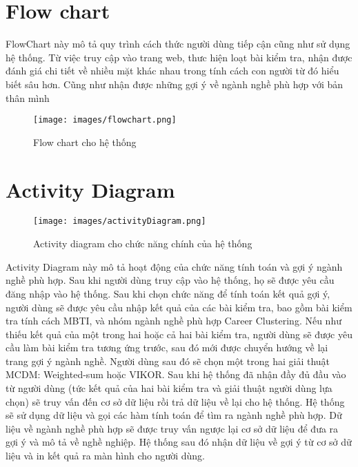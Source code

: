 \newpage 

\section{Flow chart}
FlowChart này mô tả quy trình cách thức người dùng tiếp cận cũng như sử dụng hệ thống.
Từ việc truy cập vào trang web, thưc hiện loạt bài kiểm tra, nhận được đánh giá chi tiết về nhiều mặt khác nhau
trong tính cách con người từ đó hiểu biết sâu hơn. Cũng như nhận được những gợi ý về ngành nghề phù hợp với bản thân mình

\begin{figure}[H]
    \centering
    \texttt{[image: images/flowchart.png]}
    \vspace{0.5cm}
    \caption{Flow chart cho hệ thống }
\end{figure}

\section{Activity Diagram}

\begin{figure}[H]
    \centering
    \texttt{[image: images/activityDiagram.png]}
    \vspace{0.5cm}
    \caption{Activity diagram cho chức năng chính của hệ thống }
\end{figure}

Activity Diagram này mô tả hoạt động của chức năng tính toán và gợi ý ngành nghề phù hợp. Sau khi người dùng truy cập vào hệ thống, họ sẽ được yêu cầu đăng nhập vào hệ thống. Sau khi chọn chức năng để tính toán kết quả gợi ý, người dùng sẽ được yêu cầu nhập kết quả của các bài kiểm tra, bao gồm bài kiểm tra tính cách MBTI, và nhóm ngành nghề phù hợp Career Clustering. Nếu như thiếu kết quả của một trong hai hoặc cả hai bài kiểm tra, người dùng sẽ được yêu cầu làm bài kiểm tra tương ứng trước, sau đó mới được chuyển hướng về lại trang gợi ý ngành nghề. Người dùng sau đó sẽ chọn một trong hai giải thuật MCDM: Weighted-sum hoặc VIKOR. Sau khi hệ thống đã nhận đầy đủ đầu vào từ người dùng (tức kết quả của hai bài kiểm tra và giải thuật người dùng lựa chọn) sẽ truy vấn đến cơ sở dữ liệu rồi trả dữ liệu về lại cho hệ thống. Hệ thống sẽ sử dụng dữ liệu và gọi các hàm tính toán để tìm ra ngành nghề phù hợp. Dữ liệu về ngành nghề phù hợp sẽ được truy vấn ngược lại cơ sở dữ liệu để đưa ra gợi ý và mô tả về nghề nghiệp. Hệ thống sau đó nhận dữ liệu về gợi ý từ cơ sở dữ liệu và in kết quả ra màn hình cho người dùng.

